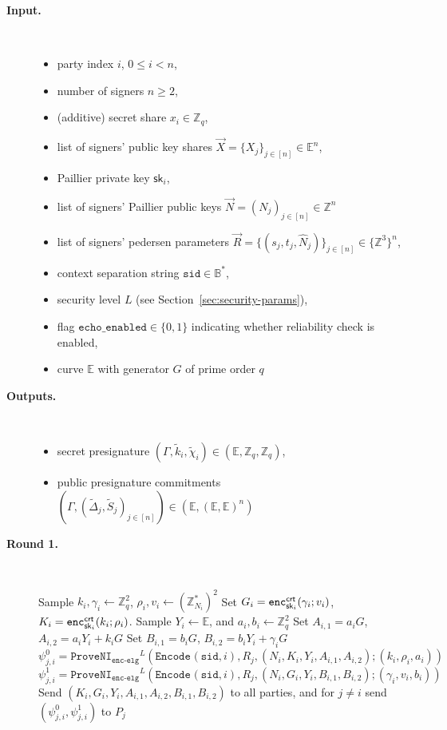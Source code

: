 \documentclass[11pt]{article}
\def\crt{{\sf crt}}
\newcommand{\enc}{\ensuremath{\mathtt{enc}}}
\newcommand{\sid}{\ensuremath{\mathtt{sid}}}
\newcommand{\var}[1]{\ensuremath{\mathtt{#1}}}
\newcommand{\proveni}[1]{\ensuremath{\mathtt{ProveNI}_{\mathtt{#1}}}}
\newcommand{\Encode}[1][]{\ensuremath{\mathtt{Encode}_{\mathtt{#1}}}}
\newcommand{\sk}{\textsf{sk}}
\newcommand{\E}{\mathbb{E}}
\newcommand{\Z}{\mathbb{Z}}
\newcommand{\?}[1]{\stackrel{?}{#1}}
\newcommand{\Bit}{\ensuremath{\{0{,}1\}}}
\newcommand{\Byte}{\ensuremath{\mathbb{B}}}
\begin{document}
\begin{description}
    \item[\bf Input.] \
    \begin{itemize}[noitemsep,topsep=0pt]
    \item party index $i$, $0 \le i < n$,
    \item number of signers $n \ge 2$,
    \item (additive) secret share $x_i \in \Z_q$,
    \item list of signers' public key shares $\vec X = \{X_j\}_{j\in[n]} \in \E^n$,
    \item Paillier private key $\sk_i$,
    \item list of signers' Paillier public keys $\vec N = (N_j)_{j\in[n]} \in \Z^n$
    \item list of signers' pedersen parameters $\vec R = \{(s_j, t_j, \hat N_j)\}_{j\in[n]} \in \{\Z^3\}^n$,
    \item context separation string $\sid \in \Byte^*$,
    \item security level $L$ (see Section~\ref{sec:security-params}),
    \item flag $\var{echo\_enabled} \in \Bit$ indicating whether reliability check is enabled,
    \item curve $\E$ with generator $G$ of prime order $q$
    \end{itemize}

    \item[\bf Outputs.] \
    \begin{itemize}[noitemsep,topsep=0pt]
    \item secret presignature $(\Gamma, \tilde k_i, \tilde \chi_i) \in (\E, \Z_q, \Z_q)$,
    \item public presignature commitments $(\Gamma, (\tilde \Delta_j, \tilde S_j)_{j\in[n]}) \in (\E, (\E, \E)^n)$
    \end{itemize}

    \item[\textbf{Round 1.}] \
    \begin{algorithmic}[1]
    \State Sample $k_i, \gamma_i \gets \Z_q^2$,
                  $\rho_i, v_i \gets (\Z^*_{N_i})^2$
    \State Set $G_i = \enc^\crt_{\sk_i}(\gamma_i; v_i)$,
               $K_i = \enc^\crt_{\sk_i}(k_i; \rho_i)$. 
    \State Sample $Y_i \gets \E$, and $a_i, b_i \gets \Z_q^2$
    \State Set $A_{i,1} = a_i G$,
               $A_{i,2} = a_i Y_i + k_i G$
    \State Set $B_{i,1} = b_i G$,
               $B_{i,2} = b_i Y_i + \gamma_i G$
    \For{$j \in [n] \setminus \{i\}$}
        \State $\psi^0_{j,i} = \proveni{enc\mbox{-}elg}^L(\Encode(\sid, i), R_j, (N_i, K_i, Y_i, A_{i,1}, A_{i,2}); (k_i, \rho_i, a_i))$
        \State $\psi^1_{j,i} = \proveni{enc\mbox{-}elg}^L(\Encode(\sid, i), R_j, (N_i, G_i, Y_i, B_{i,1}, B_{i,2}); (\gamma_i, v_i, b_i))$
    \EndFor
    \State Send $(K_i, G_i, Y_i, A_{i,1}, A_{i,2}, B_{i,1}, B_{i,2})$ to all parties, and for $j \neq i$ send $(\psi^0_{j,i}, \psi^1_{j,i})$ to $P_j$
    \end{algorithmic}



\end{description}
\end{document}
